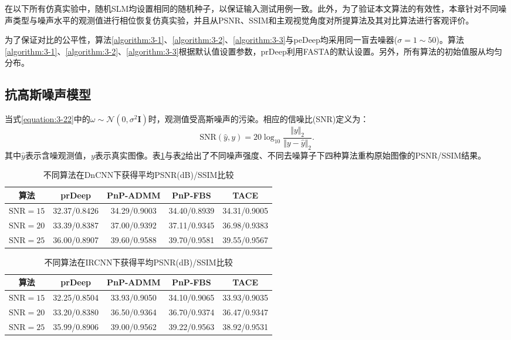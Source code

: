 在以下所有仿真实验中，随机SLM均设置相同的随机种子，以保证输入测试用例一致。此外，为了验证本文算法的有效性，本章针对不同噪声类型与噪声水平的观测值进行相位恢复仿真实验，并且从PSNR、SSIM和主观视觉角度对所提算法及其对比算法进行客观评价。

为了保证对比的公平性，算法\ref{algorithm:3-1}、\ref{algorithm:3-2}、\ref{algorithm:3-3}与peDeep均采用同一盲去噪器($\sigma=1\sim{50}$)。算法\ref{algorithm:3-1}、\ref{algorithm:3-2}、\ref{algorithm:3-3}根据默认值设置参数，prDeep利用FASTA的默认设置。另外，所有算法的初始值服从均匀分布。

\subsection{抗高斯噪声模型}
当式\eqref{equation:3-22}中的$\omega\sim{\mathcal{N}(0,\sigma^2\mathbf{I})}$时，观测值受高斯噪声的污染。相应的信噪比(SNR)定义为：
\begin{equation} \label{equation:3-23}
	\text{SNR}(\hat{y},y)=20\log_{10}{\frac{\Vert{y}\Vert_2}{\Vert{y-\hat{y}}\Vert_2}}.
\end{equation}
其中$\hat{y}$表示含噪观测值，$y$表示真实图像。表\ref{table:3-4}与表\ref{table:3-5}给出了不同噪声强度、不同去噪算子下四种算法重构原始图像的PSNR/SSIM结果。
\begin{table}[!htbp]
	\def\arraystretch{1.4}\centering{}
	\caption{不同算法在DnCNN下获得平均PSNR(dB)/SSIM比较}
	\label{table:3-4}
	\begin{tabular*}{\linewidth}{@{}@{\extracolsep{\fill}}ccccc@{}}
		\toprule	%
		算法	& prDeep & PnP-ADMM & PnP-FBS & TACE \\
		\midrule
		$\text{SNR}=15$        & 32.37/0.8426   & 34.29/0.9003  & {\color{red}34.40}/0.8939 & 34.31/{\color{red}0.9005}  \\
		$\text{SNR}=20$        & 33.39/0.8387   &37.00/{\color{red}0.9392}  &{\color{red}37.11}/0.9345 & 36.98/0.9383  \\
		$\text{SNR}=25$        & 36.00/0.8907   & 39.60/{\color{red}0.9588}  & {\color{red}39.70}/0.9581 & 39.55/0.9567  \\
		\bottomrule
	\end{tabular*}
\end{table}
\begin{table}[!htbp]
	\def\arraystretch{1.4}\centering{}
	\caption{不同算法在IRCNN下获得平均PSNR(dB)/SSIM比较}
	\label{table:3-5}
	\begin{tabular*}{\linewidth}{@{}@{\extracolsep{\fill}}ccccc@{}}
		\toprule
		算法	& prDeep & PnP-ADMM & PnP-FBS & TACE \\ %
		\midrule
		$\text{SNR}=15$        & 32.25/0.8504   & 33.93/0.9050  & {\color{red}34.10}/{\color{red}0.9065} & 33.93/0.9035  \\
		$\text{SNR}=20$        & 33.20/0.8380   & 36.50/0.9364  & {\color{red}36.70}/{\color{red}0.9374} & 36.47/0.9347  \\
		$\text{SNR}=25$        & 35.99/0.8906   & 39.00/0.9562  & {\color{red}39.22}/{\color{red}0.9563} & 38.92/0.9531  \\
		\bottomrule
	\end{tabular*}
\end{table}

